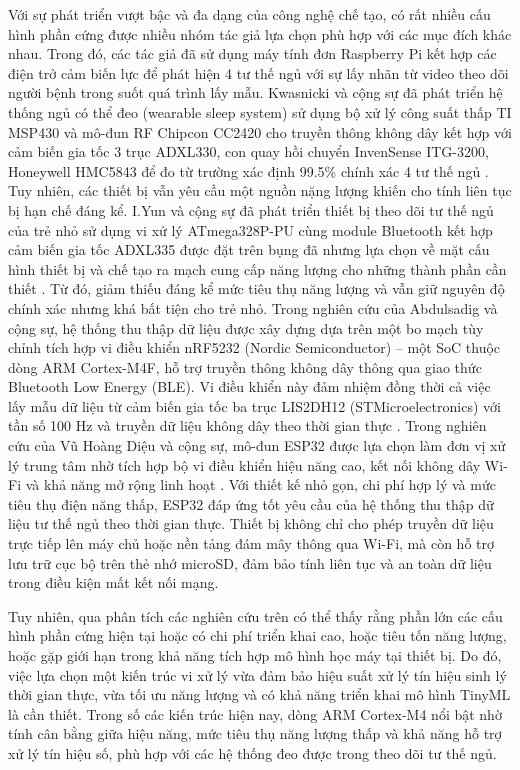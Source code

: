 Với sự phát triển vượt bậc và đa dạng của công nghệ chế tạo, 
có rất nhiều cấu hình phần cứng được nhiều nhóm tác giả lựa chọn phù 
hợp với các mục đích khác nhau. Trong đó, \cite{p_1} các tác giả đã 
sử dụng máy tính đơn Raspberry Pi kết hợp các điện trở cảm biến 
lực để phát hiện 4 tư thế ngủ với sự lấy nhãn từ video theo dõi người 
bệnh trong suốt quá trình lấy mẫu. Kwasnicki và cộng sự đã phát triển 
hệ thống ngủ có thể đeo (wearable sleep system) sử dụng bộ xử lý công 
suất thấp TI MSP430 và mô-đun RF Chipcon CC2420 cho truyền thông không 
dây kết hợp với cảm biến gia tốc 3 trục ADXL330, con quay hồi chuyển 
InvenSense ITG-3200, Honeywell HMC5843 để đo từ trường xác định 99.5\% 
chính xác 4 tư thế ngủ \cite{kwasnicki2018}. Tuy nhiên, các thiết bị vẫn 
yêu cầu một nguồn nặng lượng khiến cho tính liên tục bị hạn chế đáng kể. 
I.Yun và cộng sự đã phát triển thiết bị theo dõi tư thế ngủ của trẻ nhỏ 
sử dụng vi xử lý ATmega328P-PU cùng module Bluetooth kết hợp cảm biến gia 
tốc ADXL335 được đặt trên bụng đã nhưng lựa chọn về mặt cấu hình thiết bị 
và chế tạo ra mạch cung cấp năng lượng cho những thành phần cần thiết 
\cite{p_3}. Từ đó, giảm thiếu đáng kể mức tiêu thụ năng lượng và vẫn 
giữ nguyên độ chính xác nhưng khá bất tiện cho trẻ nhỏ. 
Trong nghiên cứu của Abdulsadig và cộng sự, 
hệ thống thu thập dữ liệu được xây dựng dựa trên một bo mạch tùy chỉnh tích 
hợp vi điều khiển nRF5232 (Nordic Semiconductor) – một SoC thuộc dòng 
ARM Cortex-M4F, hỗ trợ truyền thông không dây thông qua giao 
thức Bluetooth Low Energy (BLE). Vi điều khiển này đảm nhiệm đồng 
thời cả việc lấy mẫu dữ liệu từ cảm biến gia tốc ba trục LIS2DH12 
(STMicroelectronics) với tần số 100 Hz và truyền dữ liệu không dây 
theo thời gian thực \cite{Sleep_Posture_Detection, abdulsadig2023}. 
Trong nghiên cứu của Vũ Hoàng Diệu và cộng sự, 
mô-đun ESP32 được lựa chọn làm đơn vị xử lý trung tâm nhờ tích hợp bộ vi điều khiển hiệu năng cao, 
kết nối không dây Wi-Fi và khả năng mở rộng linh hoạt \cite{vu2023}. 
Với thiết kế nhỏ gọn, chi phí hợp lý và mức tiêu thụ điện năng thấp, 
ESP32 đáp ứng tốt yêu cầu của hệ thống thu thập dữ liệu tư thế ngủ theo 
thời gian thực. Thiết bị không chỉ cho phép truyền dữ liệu trực tiếp 
lên máy chủ hoặc nền tảng đám mây thông qua Wi-Fi, mà còn hỗ trợ 
lưu trữ cục bộ trên thẻ nhớ microSD, đảm bảo tính liên tục và 
an toàn dữ liệu trong điều kiện mất kết nối mạng.

Tuy nhiên, qua phân tích các nghiên cứu trên có thể thấy rằng phần 
lớn các cấu hình phần cứng hiện tại hoặc có chi phí triển khai cao, 
hoặc tiêu tốn năng lượng, hoặc gặp giới hạn trong khả năng tích hợp mô 
hình học máy tại thiết bị. Do đó, việc lựa chọn một kiến trúc vi xử lý 
vừa đảm bảo hiệu suất xử lý tín hiệu sinh lý thời gian thực, vừa tối 
ưu năng lượng và có khả năng triển khai mô hình TinyML là cần thiết. 
Trong số các kiến trúc hiện nay, dòng ARM Cortex-M4 nổi bật nhờ tính 
cân bằng giữa hiệu năng, mức tiêu thụ năng lượng thấp và khả năng hỗ 
trợ xử lý tín hiệu số, phù hợp với các hệ thống đeo được trong theo 
dõi tư thế ngủ.


